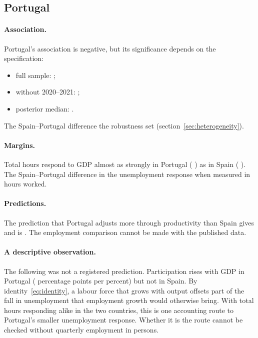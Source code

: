 \subsection{Portugal}

\paragraph{Association.} Portugal's association is negative, but its significance depends
on the specification:
\begin{itemize}
  \item full sample:  ;
  \item without 2020--2021:  ;
  \item posterior median:  .
\end{itemize}
The Spain--Portugal difference  the robustness set
(section~\ref{sec:heterogeneity}).

\paragraph{Margins.} Total hours respond to GDP almost as strongly in Portugal
( ) as in Spain ( ). The
Spain--Portugal difference in the unemployment response  when
measured in hours worked.

\paragraph{Predictions.} The prediction that Portugal adjusts more through productivity
than Spain gives   and is . The employment
comparison cannot be made with the published data.

\paragraph{A descriptive observation.} The following was not a registered prediction.
Participation rises with GDP in Portugal (  percentage
points per percent) but not in Spain. By identity~\eqref{eq:identity}, a labour force that
grows with output offsets part of the fall in unemployment that employment growth would
otherwise bring. With total hours responding alike in the two countries, this is one
accounting route to Portugal's smaller unemployment response. Whether it is the route
cannot be checked without quarterly employment in persons.

